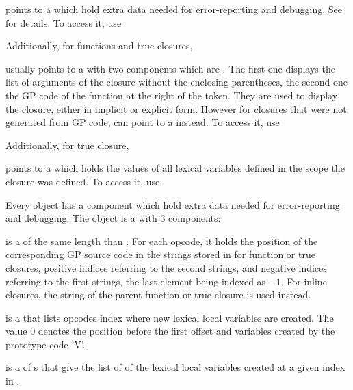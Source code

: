 
\item {} points to a  which hold extra data needed for
error-reporting and debugging. See  for details.
To access it, use


Additionally, for functions and true closures,

\item {} usually points to a  with two components which are .
The first one displays the list of arguments of the closure without the
enclosing parentheses, the second one the GP code of the function at the
right of the \kbd{->} token. They are used to display the closure, either in
implicit or explicit form. However for closures that were not generated from GP
code,  can point to a  instead. To access it, use


Additionally, for true closure,

\item {} points to a  which holds the values of all lexical
variables defined in the scope the closure was defined. To access it, use


\label{se:dbgclosure}

Every  object  has a component 
which hold extra data needed for error-reporting and debugging.
The object  is a  with $3$ components:

 is a  of the same length than . For each
opcode, it holds the position of the corresponding GP source code in the
strings stored in  for function or true closures, positive indices
referring to the second strings, and negative indices referring to the first
strings, the last element being indexed as $-1$. For inline closures, the
string of the parent function or true closure is used instead.

 is a  that lists opcodes index where new lexical
local variables are created. The value $0$ denotes the position before the
first offset and variables created by the prototype code 'V'.

 is a  of s that give the list of
 of the lexical local variables created at a given index in
.

